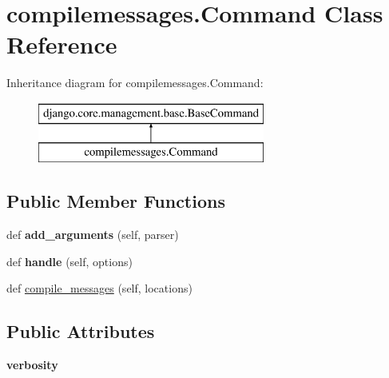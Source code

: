 \hypertarget{classcompilemessages_1_1_command}{}\section{compilemessages.\+Command Class Reference}
\label{classcompilemessages_1_1_command}
Inheritance diagram for compilemessages.\+Command\+:\begin{figure}[H]
\begin{center}
\leavevmode
\includegraphics[height=2.000000cm]{classcompilemessages_1_1_command}
\end{center}
\end{figure}
\subsection*{Public Member Functions}
\begin{DoxyCompactItemize}
\item 
\mbox{\label{classcompilemessages_1_1_command_a1d33f6ff6c42a75c97c2f9cfc781cdf8}} 
def {\bfseries add\+\_\+arguments} (self, parser)
\item 
\mbox{\label{classcompilemessages_1_1_command_ae5bd09b15f29c3dda524e4b42728bad8}} 
def {\bfseries handle} (self, options)
\item 
def \mbox{\hyperlink{classcompilemessages_1_1_command_ac5890ffaba81b8c72b4634c0b0e49328}{compile\+\_\+messages}} (self, locations)
\end{DoxyCompactItemize}
\subsection*{Public Attributes}
\begin{DoxyCompactItemize}
\item 
\mbox{\label{classcompilemessages_1_1_command_ae49c1663bebb1d269f03bb150e534e0d}} 
{\bfseries verbosity}
\end{DoxyCompactItemize}
